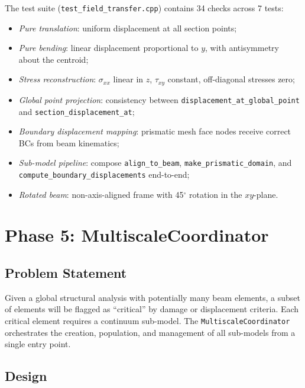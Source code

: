 The test suite (\texttt{test\_field\_transfer.cpp}) contains 34 checks
across 7 tests:
\begin{itemize}
  \item \emph{Pure translation}: uniform displacement at all section points;
  \item \emph{Pure bending}: linear displacement proportional to $y$, with
        antisymmetry about the centroid;
  \item \emph{Stress reconstruction}: $\sigma_{xx}$ linear in $z$,
        $\tau_{xy}$ constant, off-diagonal stresses zero;
  \item \emph{Global point projection}: consistency between
        \texttt{displacement\_at\_global\_point} and
        \texttt{section\_displacement\_at};
  \item \emph{Boundary displacement mapping}: prismatic mesh face nodes
        receive correct BCs from beam kinematics;
  \item \emph{Sub-model pipeline}: compose \texttt{align\_to\_beam},
        \texttt{make\_prismatic\_domain}, and
        \texttt{compute\_boundary\_displacements} end-to-end;
  \item \emph{Rotated beam}: non-axis-aligned frame with 45$^\circ$
        rotation in the $xy$-plane.
\end{itemize}


\section{Phase 5: MultiscaleCoordinator}
\label{sec:phase5_coordinator}

\subsection{Problem Statement}

Given a global structural analysis with potentially many beam elements,
a subset of elements will be flagged as ``critical'' by damage or
displacement criteria.  Each critical element requires a continuum
sub-model.  The \texttt{MultiscaleCoordinator} orchestrates the
creation, population, and management of all sub-models from a single
entry point.

\subsection{Design}

